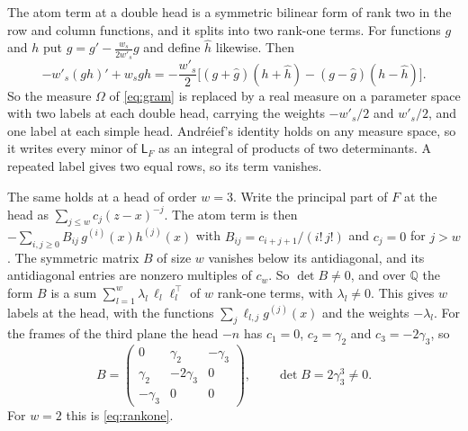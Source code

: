 \documentclass[11pt]{amsart}
\theoremstyle{definition}
\theoremstyle{remark}
\numberwithin{equation}{section}
\newcommand{\Q}{\mathbb Q}
\newcommand{\Lw}{\mathsf L}          %
\begin{document}
The atom term at a double head is a symmetric bilinear form of rank two in the row and column functions, and it splits
into two rank-one terms. For functions $g$ and $h$ put $\hat g=g'-\frac{w_s}{2w'_s}g$ and define $\hat h$ likewise. Then
\begin{equation}\label{eq:rankone}
 -w'_s(gh)'+w_sgh=-\frac{w'_s}2\bigl[(g+\hat g)(h+\hat h)-(g-\hat g)(h-\hat h)\bigr].
\end{equation}
So the measure $\Omega$ of \eqref{eq:gram} is replaced by a real measure on a parameter space with two labels at each
double head, carrying the weights $-w'_s/2$ and $w'_s/2$, and one label at each simple head. Andr\'eief's identity holds on any
measure space, so it writes every minor of $\Lw_F$ as an integral of products of two determinants. A repeated label
gives two equal rows, so its term vanishes.

The same holds at a head of order $w=3$. Write the principal part of $F$ at the head as $\sum_{j\le w}c_j(z-x)^{-j}$.
The atom term is then $-\sum_{i,j\ge0}B_{ij}\,g^{(i)}(x)h^{(j)}(x)$ with $B_{ij}=c_{i+j+1}/(i!\,j!)$ and $c_j=0$ for $j>w$.
The symmetric matrix $B$ of size $w$ vanishes below its antidiagonal, and its antidiagonal entries are nonzero
multiples of $c_w$. So $\det B\ne0$, and over $\Q$ the form $B$ is a sum $\sum_{l=1}^w\lambda_l\,\ell_l\ell_l^{\top}$ of
$w$ rank-one terms, with $\lambda_l\ne0$. This gives $w$ labels at the head, with the functions
$\sum_j\ell_{l,j}g^{(j)}(x)$ and the weights $-\lambda_l$. For the frames of the third plane the head $-n$ has
$c_1=0$, $c_2=\gamma_2$ and $c_3=-2\gamma_3$, so
\[
 B=\begin{pmatrix}0&\gamma_2&-\gamma_3\\ \gamma_2&-2\gamma_3&0\\ -\gamma_3&0&0\end{pmatrix},\qquad \det B=2\gamma_3^3\ne0 .
\]
For $w=2$ this is \eqref{eq:rankone}.
\end{document}
